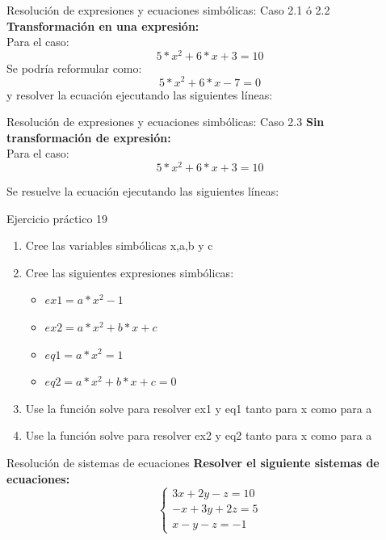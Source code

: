 \documentclass{bredelebeamer}
\begin{document}
\begin{frame}{Resolución de expresiones y ecuaciones simbólicas: Caso 2.1 ó 2.2}
\textbf{Transformación en una expresión:}\\
Para el caso:
\begin{equation*}
5*x^2+6*x+3=10
\end{equation*}
Se podría reformular como:
\begin{equation*}
5*x^2+6*x-7=0
\end{equation*}
y resolver la ecuación ejecutando las siguientes líneas:

\end{frame}

\begin{frame}{Resolución de expresiones y ecuaciones simbólicas: Caso 2.3}
\textbf{Sin transformación de expresión:}\\
Para el caso:
\begin{equation*}
5*x^2+6*x+3=10
\end{equation*}

Se resuelve la ecuación ejecutando las siguientes líneas:

\end{frame}

\begin{frame}{Ejercicio práctico 19}
\begin{enumerate}
\item Cree las variables simbólicas x,a,b y c 
\item Cree las siguientes expresiones simbólicas:
\begin{itemize}
\item $ex1 = a*x^2-1$
\item $ex2 = a*x^2+b*x+c$
\end{itemize}
\begin{itemize}
\item $eq1 = a*x^2=1$
\item $eq2 = a*x^2+b*x+c=0$
\end{itemize}
\item Use la función solve para resolver ex1 y eq1 tanto para x como para a
\item Use la función solve para resolver ex2 y eq2 tanto para x como para a
\end{enumerate}
\end{frame}

\begin{frame}{Resolución de sistemas de ecuaciones}
\textbf{Resolver el siguiente sistemas de ecuaciones:}
\begin{equation*}
\left\{\begin{matrix}
3x + 2y - z = 10  \\ 
-x +3y +2z = 5  \\ 
 x - y - z = -1 
\end{matrix}\right.
\end{equation*}
\end{frame}
\end{document}
